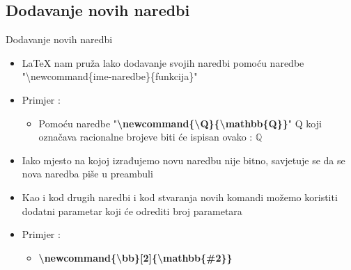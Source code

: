 \documentclass{beamer}
\begin{document}
\subsection{Dodavanje novih naredbi}

\begin{frame}[t]{Dodavanje novih naredbi}
\begin{itemize}
	\item LaTeX nam pruža lako dodavanje svojih naredbi pomoću naredbe "\textbackslash newcommand\{ime-naredbe\}\{funkcija\}"
	\item Primjer :
	\begin{itemize}
		\newcommand{\Q}{\mathbb{Q}} 
		\item Pomoću naredbe "\textbf{\textbackslash newcommand\{\textbackslash Q\}\{\textbackslash mathbb\{Q\}\}}" Q koji označava racionalne brojeve biti će ispisan ovako : \( \Q \)
	\end{itemize}
	\item Iako mjesto na kojoj izrađujemo novu naredbu nije bitno, savjetuje se da se nova naredba piše u preambuli	 
	\item Kao i kod drugih naredbi i kod stvaranja novih komandi možemo koristiti dodatni parametar koji će odrediti broj parametara 
	\item Primjer :
		\begin{itemize}
			\item \textbf{\textbackslash newcommand\{\textbackslash bb\}{[}2{]}\{\textbackslash mathbb\{\#2\}\}}
		\end{itemize}	
\end{itemize}	
\end{frame}



\end{document}
